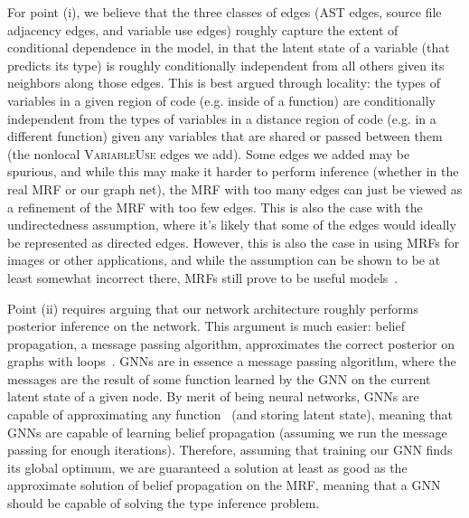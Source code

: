 For point (i), we believe that the three classes of edges (AST edges, source file adjacency edges, and variable use edges) roughly capture the extent of conditional dependence in the model, in that the latent state of a variable (that predicts its type) is roughly conditionally independent from all others given its neighbors along those edges.
This is best argued through locality: the types of variables in a given region of code (e.g. inside of a function) are conditionally independent from the types of variables in a distance region of code (e.g. in a different function) given any variables that are shared or passed between them (the nonlocal \textsc{VariableUse} edges we add).
Some edges we added may be spurious, and while this may make it harder to perform inference (whether in the real MRF or our graph net), the MRF with too many edges can just be viewed as a refinement of the MRF with too few edges.
This is also the case with the undirectedness assumption, where it's likely that some of the edges would ideally be represented as directed edges.
However, this is also the case in using MRFs for images or other applications, and while the assumption can be shown to be at least somewhat incorrect there, MRFs still prove to be useful models~\cite{rangarajan95markov}.

Point (ii) requires arguing that our network architecture roughly performs posterior inference on the network.
This argument is much easier: belief propagation, a message passing algorithm, approximates the correct posterior on graphs with loops~\cite{weiss2000correctness}.
GNNs are in essence a message passing algorithm, where the messages are the result of some function learned by the GNN on the current latent state of a given node.
By merit of being neural networks, GNNs are capable of approximating any function~\cite{hornik1989multilayer} (and storing latent state), meaning that GNNs are capable of learning belief propagation (assuming we run the message passing for enough iterations).
Therefore, assuming that training our GNN finds its global optimum, we are guaranteed a solution at least as good as the approximate solution of belief propagation on the MRF, meaning that a GNN should be capable of solving the type inference problem.